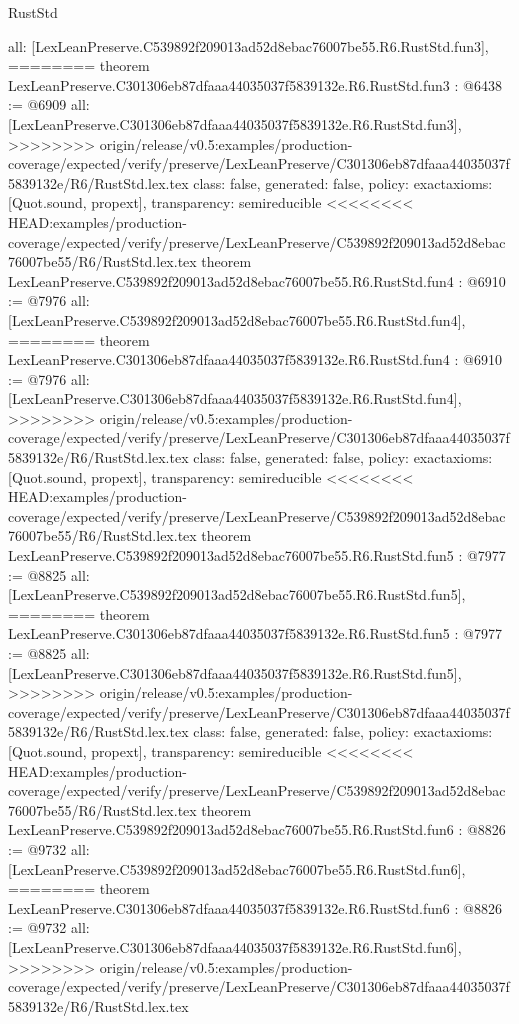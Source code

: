 \begin{lexlean}{RustStd}
\begin{coremodule}
{\begin{coremodule}
{{{{{{  all: [LexLeanPreserve.C539892f209013ad52d8ebac76007be55.R6.RustStd.fun3],
========
theorem LexLeanPreserve.C301306eb87dfaaa44035037f5839132e.R6.RustStd.fun3 : @6438 := @6909 {
  all: [LexLeanPreserve.C301306eb87dfaaa44035037f5839132e.R6.RustStd.fun3],
>>>>>>>> origin/release/v0.5:examples/production-coverage/expected/verify/preserve/LexLeanPreserve/C301306eb87dfaaa44035037f5839132e/R6/RustStd.lex.tex
  class: false,
  generated: false,
  policy: exact{axioms: [Quot.sound, propext]},
  transparency: semireducible
}
<<<<<<<< HEAD:examples/production-coverage/expected/verify/preserve/LexLeanPreserve/C539892f209013ad52d8ebac76007be55/R6/RustStd.lex.tex
theorem LexLeanPreserve.C539892f209013ad52d8ebac76007be55.R6.RustStd.fun4 : @6910 := @7976 {
  all: [LexLeanPreserve.C539892f209013ad52d8ebac76007be55.R6.RustStd.fun4],
========
theorem LexLeanPreserve.C301306eb87dfaaa44035037f5839132e.R6.RustStd.fun4 : @6910 := @7976 {
  all: [LexLeanPreserve.C301306eb87dfaaa44035037f5839132e.R6.RustStd.fun4],
>>>>>>>> origin/release/v0.5:examples/production-coverage/expected/verify/preserve/LexLeanPreserve/C301306eb87dfaaa44035037f5839132e/R6/RustStd.lex.tex
  class: false,
  generated: false,
  policy: exact{axioms: [Quot.sound, propext]},
  transparency: semireducible
}
<<<<<<<< HEAD:examples/production-coverage/expected/verify/preserve/LexLeanPreserve/C539892f209013ad52d8ebac76007be55/R6/RustStd.lex.tex
theorem LexLeanPreserve.C539892f209013ad52d8ebac76007be55.R6.RustStd.fun5 : @7977 := @8825 {
  all: [LexLeanPreserve.C539892f209013ad52d8ebac76007be55.R6.RustStd.fun5],
========
theorem LexLeanPreserve.C301306eb87dfaaa44035037f5839132e.R6.RustStd.fun5 : @7977 := @8825 {
  all: [LexLeanPreserve.C301306eb87dfaaa44035037f5839132e.R6.RustStd.fun5],
>>>>>>>> origin/release/v0.5:examples/production-coverage/expected/verify/preserve/LexLeanPreserve/C301306eb87dfaaa44035037f5839132e/R6/RustStd.lex.tex
  class: false,
  generated: false,
  policy: exact{axioms: [Quot.sound, propext]},
  transparency: semireducible
}
<<<<<<<< HEAD:examples/production-coverage/expected/verify/preserve/LexLeanPreserve/C539892f209013ad52d8ebac76007be55/R6/RustStd.lex.tex
theorem LexLeanPreserve.C539892f209013ad52d8ebac76007be55.R6.RustStd.fun6 : @8826 := @9732 {
  all: [LexLeanPreserve.C539892f209013ad52d8ebac76007be55.R6.RustStd.fun6],
========
theorem LexLeanPreserve.C301306eb87dfaaa44035037f5839132e.R6.RustStd.fun6 : @8826 := @9732 {
  all: [LexLeanPreserve.C301306eb87dfaaa44035037f5839132e.R6.RustStd.fun6],
>>>>>>>> origin/release/v0.5:examples/production-coverage/expected/verify/preserve/LexLeanPreserve/C301306eb87dfaaa44035037f5839132e/R6/RustStd.lex.tex
}}}}}}}}}}
\end{coremodule}}
\end{coremodule}
\end{lexlean}
